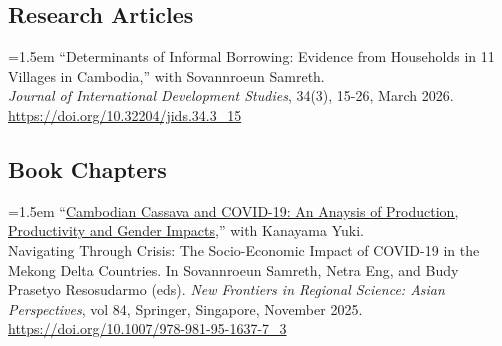 \documentclass[10pt,a4paper]{article}
\begin{document}



\subsection*{Research Articles}
	\hangindent=1.5em
``Determinants of Informal Borrowing: Evidence from Households in 11 Villages in Cambodia,'' with Sovannroeun Samreth. \\
\textit{Journal of International Development Studies},  34(3), 15-26, March 2026. \url{https://doi.org/10.32204/jids.34.3_15}


\subsection*{Book Chapters}

\hangindent=1.5em
“\href{https://link.springer.com/chapter/10.1007/978-981-95-1637-7_3}{Cambodian Cassava and COVID-19: An Anaysis of Production, Productivity and Gender Impacts},” with Kanayama Yuki. \\
Navigating Through Crisis: The Socio-Economic Impact of COVID-19 in the Mekong Delta Countries. In Sovannroeun Samreth, Netra Eng, and Budy Prasetyo Resosudarmo (eds). \textit{New Frontiers in Regional Science: Asian Perspectives}, vol 84, Springer, Singapore, November 2025. \url{https://doi.org/10.1007/978-981-95-1637-7_3} \\ \vspace{-.5em} 
\end{document}
